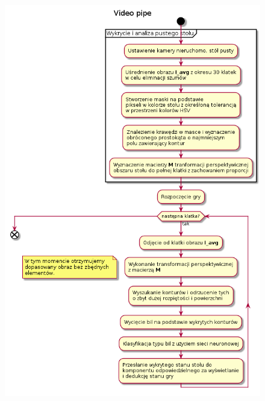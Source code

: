 \documentclass[12pt]{article}
\begin{document}
\newpage
\begin{figure}[H]
    \centering
    \includegraphics[width=14cm]{./diagrams/out/video_pipe.png}
    \caption{}
    \label{}
\end{figure}
\end{document}
